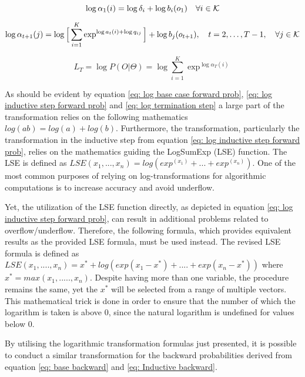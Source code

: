 \begin{equation}
    \log\alpha_1(i) = \log\delta_i + \log b_i(o_1)
    \quad \forall i \in\operatorname{\mathcal{K}}
    \label{eq: log base case forward prob}
\end{equation}

\begin{equation}
    \log\alpha_{t+1}(j) = \log\Big[\sum_{i=1}^K \exp^{\log a_t(i)+\log q_{ij}}\Big] + \log b_j(o_{t+1}),
    \quad t=2,\ldots,T-1, 
    \quad \forall j \in\operatorname{\mathcal{K}}
    \label{eq: log inductive step forward prob}
\end{equation}

\begin{equation}
     L_T = \log P(O |\Theta) = \log\sum_{i=1}^K \exp^{\log\alpha_T(i)}
    \label{eq: log termination step}
\end{equation}

As should be evident by equation \ref{eq: log base case forward prob}, \ref{eq: log inductive step forward prob} and \ref{eq: log termination step} a large part of the transformation relies on the following mathematics $log(ab) = log(a) + log(b)$. Furthermore, the transformation, particularly the transformation in the inductive step from equation \ref{eq: log inductive step forward prob}, relies on the mathematics guiding the LogSumExp (LSE) function. The LSE is defined as $LSE(x_1,...,x_n) = log(exp^{(x_1)}+...+exp^{(x_n)})$. One of the most common purposes of relying on log-transformations for algorithmic computations is to increase accuracy and avoid underflow. 

Yet, the utilization of the LSE function directly, as depicted in equation \ref{eq: log inductive step forward prob}, can result in additional problems related to overflow/underflow. Therefore, the following formula, which provides equivalent results as the provided LSE formula, must be used instead. The revised LSE formula is defined as $LSE(x_1,....,x_n) = x^* + log(exp(x_1-x^*)+....+exp(x_n-x^*))$ where $x^* = max(x_1,.....,x_n)$. Despite having more than one variable, the procedure remains the same, yet the $x^*$ will be selected from a range of multiple vectors. This mathematical trick is done in order to ensure that the number of which the logarithm is taken is above 0, since the natural logarithm is undefined for values below 0. 

By utilising the logarithmic transformation formulas just presented, it is possible to conduct a similar transformation for the backward probabilities derived from equation \ref{eq: base backward} and \ref{eq: Inductive backward}. 

